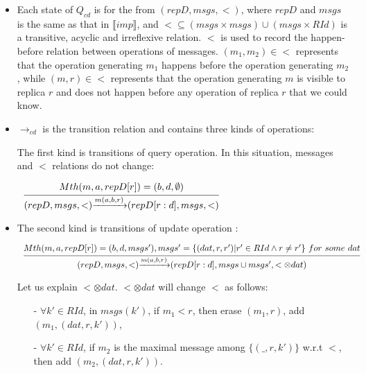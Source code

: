 \begin {itemize}
\setlength{\itemsep}{0.5pt}
\item[-] Each state of $Q_{cd}$ is for the from $(repD,msgs,<)$, where $repD$ and $msgs$ is the same as that in $\llbracket imp \rrbracket$, and $< \subseteq (msgs \times msgs) \cup (msgs \times RId)$ is a transitive, acyclic and irreflexive relation. $<$ is used to record the happen-before relation between operations of messages. %
    $(m_1,m_2) \in <$ represents that the operation generating $m_1$ happens before the operation generating $m_2$, while $(m,r) \in <$ represents that the operation generating $m$ is visible to replica $r$ and does not happen before any operation of replica $r$ that we could know. 

\item[-] $\rightarrow_{cd}$ is the transition relation and contains three kinds of operations:

    The first kind is transitions of query operation. In this situation, messages and $<$ relations do not change:

    $\begin{array}{l c} \bigfrac{ Mth(m,a,repD[r]) = (b,d,\emptyset)} {(repD,msgs,<) {\xrightarrow{m(a,b,r)}} (repD[r:d],msgs,<)} \end{array}$



\item[-] The second kind is transitions of update operation :

    $\begin{array}{l c} \bigfrac{ Mth(m,a,repD[r]) = (b,d,msgs'), msgs' = \{ (dat,r,r') \vert r' \in RId \wedge r \neq r' \} \ for \ some \ dat} {(repD,msgs,<) {\xrightarrow{m(a,b,r)}} (repD[r:d],msgs \cup msgs',< \otimes dat)} \end{array}$

    Let us explain $< \otimes dat$. $< \otimes dat$ will change $<$ as follows:

    \begin{itemize}
    \setlength{\itemsep}{0.5pt}
    \item[-] $\forall k' \in RId$, in $msgs(k')$, if $m_1 < r$, then erase $(m_1,r)$, add $(m_1,(dat,r,k'))$,

    \item[-] $\forall k' \in RId$, if $m_2$ is the maximal message among $\{ (\_,r,k') \}$ w.r.t $<$, then add $(m_2,(dat,r,k'))$.


\end{itemize}
\end{itemize}
